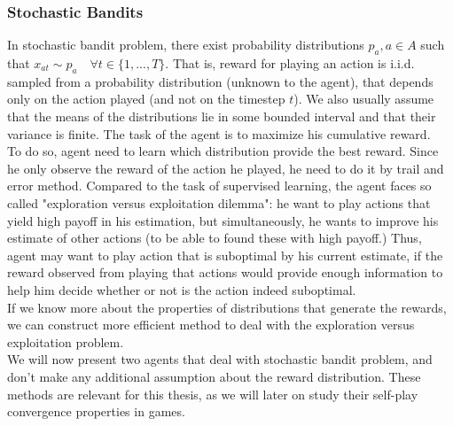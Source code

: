 \documentclass{article}
\theoremstyle{remark}
\theoremstyle{definition}
\begin{document}
\subsubsection{Stochastic Bandits}
In stochastic bandit problem, there exist probability distributions $p_a, a \in A$ such that $x_{at} \sim p_a \quad \forall t \in \{1,...,T\}$. That is, reward for playing an action is i.i.d. sampled from a probability distribution (unknown to the agent), that depends only on the action played (and not on the timestep $t$). We also usually assume that the means of the distributions lie in some bounded interval and that their variance is finite.  The task of the agent is to maximize his cumulative reward.\\
To do so, agent need to learn which distribution provide the best reward. Since he only observe the reward of the action he played, he need to do it by trail and error method. Compared to the task of supervised learning, the agent faces so called "exploration versus exploitation dilemma": he want to play actions that yield high payoff in his estimation, but simultaneously, he wants to improve his estimate of other actions (to be able to found these with high payoff.) Thus, agent may want to play action that is suboptimal by his current estimate, if the reward observed from playing that actions would provide enough information to help him decide whether or not is the action indeed suboptimal. \\
If we know more about the properties of distributions that generate the rewards, we can construct more efficient method to deal with the exploration versus exploitation problem. \\
We will now present two agents that deal with stochastic bandit problem, and don't make any additional assumption about the reward distribution. These methods are relevant for this thesis, as we will later on study their self-play convergence properties in games.
\end{document}
